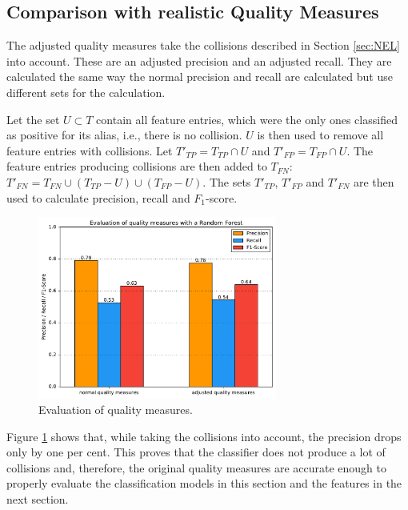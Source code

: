 \subsection{Comparison with realistic Quality Measures}
The adjusted quality measures take the collisions described in Section \ref{sec:NEL} into account. These are an adjusted precision and an adjusted recall. They are calculated the same way the normal precision and recall are calculated but use different sets for the calculation.\par
Let the set $U \subset T$ contain all feature entries, which were the only ones classified as positive for its alias, i.e., there is no collision. $U$ is then used to remove all feature entries with collisions. Let $T'_{TP} = T_{TP} \cap U$ and $T'_{FP} = T_{FP} \cap U$. The feature entries producing collisions are then added to $T_{FN}$: $T'_{FN} = T_{FN} \cup (T_{TP} - U) \cup (T_{FP} - U)$. The sets $T'_{TP}$, $T'_{FP}$ and $T'_{FN}$ are then used to calculate precision, recall and $F_1$-score.\par
\begin{figure}[H]
	\centering
	\includegraphics[width=0.7\textwidth]{img/qualitymeasure_eval}
	\caption{Evaluation of quality measures.}
	\label{qualitymeasure_eval}
\end{figure}
Figure \ref{qualitymeasure_eval} shows that, while taking the collisions into account, the precision drops only by one per cent. This proves that the classifier does not produce a lot of collisions and, therefore, the original quality measures are accurate enough to properly evaluate the classification models in this section and the features in the next section.
